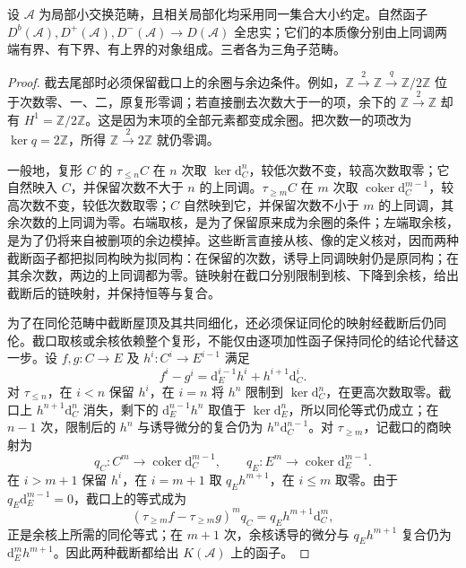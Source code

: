 \begin{proposition}\label{b4:prop:bounded-derived-full}
	设 \(\mathcal A\) 为局部小交换范畴，且相关局部化均采用同一集合大小约定。自然函子 \(D^b(\mathcal A),D^+(\mathcal A),D^-(\mathcal A)\to D(\mathcal A)\) 全忠实；它们的本质像分别由上同调两端有界、有下界、有上界的对象组成。三者各为三角子范畴。
\end{proposition}
\begin{proof}
	截去尾部时必须保留截口上的余圈与余边条件。例如，\(\mathbb Z\xrightarrow{2}\mathbb Z\xrightarrow{q}\mathbb Z/2\mathbb Z\) 位于次数零、一、二，原复形零调；若直接删去次数大于一的项，余下的 \(\mathbb Z\xrightarrow{2}\mathbb Z\) 却有 \(H^1=\mathbb Z/2\mathbb Z\)。这是因为末项的全部元素都变成余圈。把次数一的项改为 \(\ker q=2\mathbb Z\)，所得 \(\mathbb Z\xrightarrow{2}2\mathbb Z\) 就仍零调。

	一般地，复形 \(C\) 的 \(\tau_{\le n}C\) 在 \(n\) 次取 \(\ker \mathrm{d}_C^n\)，较低次数不变，较高次数取零；它自然映入 \(C\)，并保留次数不大于 \(n\) 的上同调。\(\tau_{\ge m}C\) 在 \(m\) 次取 \(\operatorname{coker}\mathrm{d}_C^{m-1}\)，较高次数不变，较低次数取零；\(C\) 自然映到它，并保留次数不小于 \(m\) 的上同调，其余次数的上同调为零。右端取核，是为了保留原来成为余圈的条件；左端取余核，是为了仍将来自被删项的余边模掉。这些断言直接从核、像的定义核对，因而两种截断函子都把拟同构映为拟同构：在保留的次数，诱导上同调映射仍是原同构；在其余次数，两边的上同调都为零。链映射在截口分别限制到核、下降到余核，给出截断后的链映射，并保持恒等与复合。

	为了在同伦范畴中截断屋顶及其共同细化，还必须保证同伦的映射经截断后仍同伦。截口取核或余核依赖整个复形，不能仅由逐项加性函子保持同伦的结论代替这一步。设 \(f,g:C\to E\) 及 \(h^i:C^i\to E^{i-1}\) 满足
	\[
		f^i-g^i=\mathrm{d}_E^{i-1}h^i+h^{i+1}\mathrm{d}_C^i.
	\]
	对 \(\tau_{\le n}\)，在 \(i<n\) 保留 \(h^i\)，在 \(i=n\) 将 \(h^n\) 限制到 \(\ker\mathrm{d}_C^n\)，在更高次数取零。截口上 \(h^{n+1}\mathrm{d}_C^n\) 消失，剩下的 \(\mathrm{d}_E^{n-1}h^n\) 取值于 \(\ker\mathrm{d}_E^n\)，所以同伦等式仍成立；在 \(n-1\) 次，限制后的 \(h^n\) 与诱导微分的复合仍为 \(h^n\mathrm{d}_C^{n-1}\)。对 \(\tau_{\ge m}\)，记截口的商映射为
	\[
		q_C:C^m\to\operatorname{coker}\mathrm{d}_C^{m-1}, \qquad q_E:E^m\to\operatorname{coker}\mathrm{d}_E^{m-1}.
	\]
	在 \(i>m+1\) 保留 \(h^i\)，在 \(i=m+1\) 取 \(q_Eh^{m+1}\)，在 \(i\le m\) 取零。由于 \(q_E\mathrm{d}_E^{m-1}=0\)，截口上的等式成为
	\[
		(\tau_{\ge m}f-\tau_{\ge m}g)^m q_C =q_Eh^{m+1}\mathrm{d}_C^m,
	\]
	正是余核上所需的同伦等式；在 \(m+1\) 次，余核诱导的微分与 \(q_Eh^{m+1}\) 复合仍为 \(\mathrm{d}_E^mh^{m+1}\)。因此两种截断都给出 \(K(\mathcal A)\) 上的函子。


\end{proof}
